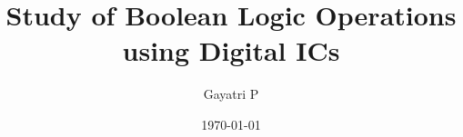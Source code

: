 \documentclass[reprint,amsmath,amssymb,aps]{revtex4-2}
\begin{document}
    \title{Study of Boolean Logic Operations using Digital ICs}

    \author{Gayatri P}
    \date{\today}

    
    \maketitle

    
    
    
    

    \appendix

    

    
    \nocite{*}
\end{document}
